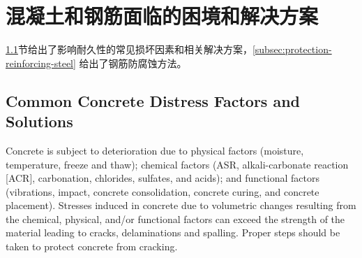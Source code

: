 \section{混凝土和钢筋面临的困境和解决方案}
\label{sec:concrete-steel-distresses-solutions}

\cref{subsec:common-factors}节给出了影响耐久性的常见损坏因素和相关解决方案，\cref{subsec:protection-reinforcing-steel} 给出了钢筋防腐蚀方法。

\subsection{Common Concrete Distress Factors and Solutions}\label{subsec:common-factors}
Concrete is subject to deterioration due to physical factors (moisture, temperature, freeze and thaw); chemical
factors (ASR, alkali-carbonate reaction [ACR], carbonation, chlorides, sulfates, and acids); and functional factors
(vibrations, impact, concrete consolidation, concrete curing, and concrete placement). Stresses induced in concrete
due to volumetric changes resulting from the chemical, physical, and/or functional factors can exceed the strength of
the material leading to cracks, delaminations and spalling. Proper steps should be taken to protect concrete from
cracking.

